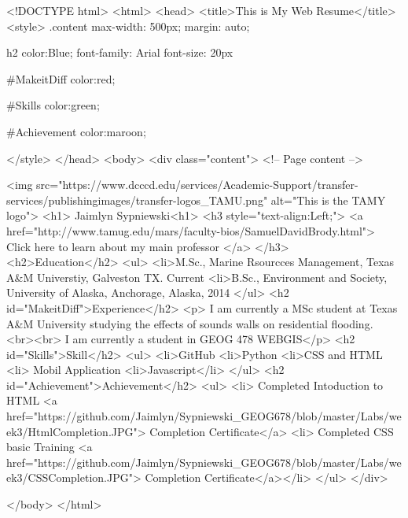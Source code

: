 <!DOCTYPE html>
<html>
	<head>
		<title>This is My Web Resume</title>
		<style>
		.content{
		max-width: 500px;
		margin: auto;
		}
		
		h2{
		color:Blue;
		font-family: Arial
		font-size: 20px
		}
		
		#MakeitDiff{
		color:red;}
		
		#Skills{
		color:green;}
		
		#Achievement{
		color:maroon;}
		
		</style>
	</head>
		<body>
		<div class="content">
		<!-- Page content -->
		
	<img src="https://www.dcccd.edu/services/Academic-Support/transfer-services/publishingimages/transfer-logos_TAMU.png"
					alt="This is the TAMY logo">
			<h1> Jaimlyn Sypniewski<h1>
				<h3 style="text-align:Left;">
					<a href="http://www.tamug.edu/mars/faculty-bios/SamuelDavidBrody.html">
					Click here to learn about my main professor </a>
				</h3>
			<h2>Education</h2>
				<ul>
					<li>M.Sc., Marine Rsourcces Management, Texas A&M Universtiy, Galveston TX. Current
					<li>B.Sc., Environment and Society, University of Alaska, Anchorage, Alaska, 2014
				</ul>
			<h2 id="MakeitDiff">Experience</h2>
				<p> I am currently a MSc student at Texas A&M University studying the effects of sounds walls on residential flooding. <br><br>
				I am currently a student in GEOG 478 WEBGIS</p>
			<h2 id="Skills">Skill</h2>
				<ul>
					<li>GitHub
					<li>Python
					<li>CSS and HTML
					<li> Mobil Application	
					<li>Javascript</li>
				</ul>
		<h2 id="Achievement">Achievement</h2>
			<ul>
				<li> Completed Intoduction to HTML
				<a href="https://github.com/Jaimlyn/Sypniewski_GEOG678/blob/master/Labs/week3/HtmlCompletion.JPG">
				Completion Certificate</a>
				<li> Completed CSS basic Training
				<a href="https://github.com/Jaimlyn/Sypniewski_GEOG678/blob/master/Labs/week3/CSSCompletion.JPG">
				Completion Certificate</a></li>
			</ul>
			</div>
	
		</body>
</html>

